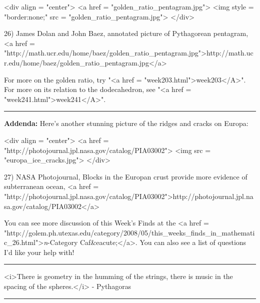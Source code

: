 <div align = "center">
<a href = "golden_ratio_pentagram.jpg">
<img style = "border:none;" src = "golden_ratio_pentagram.jpg">
</div>

26) James Dolan and John Baez, annotated picture of Pythagorean 
pentagram, <a href = "http://math.ucr.edu/home/baez/golden_ratio_pentagram.jpg">http://math.ucr.edu/home/baez/golden_ratio_pentagram.jpg</a>

For more on the golden ratio, try "<a href = "week203.html">week203</A>".  For more on its 
relation to the dodecahedron, see "<a href = "week241.html">week241</A>".

\par\noindent\rule{\textwidth}{0.4pt}
\textbf{Addenda:}
Here's another stunning picture of the ridges and cracks on Europa:

<div align = "center">
<a href = "http://photojournal.jpl.nasa.gov/catalog/PIA03002">
<img src = "europa_ice_cracks.jpg">
</div>

27) NASA Photojournal, Blocks in the Europan crust provide
more evidence of subterranean ocean, <a href = "http://photojournal.jpl.nasa.gov/catalog/PIA03002">http://photojournal.jpl.nasa.gov/catalog/PIA03002</a>

You can see more discussion of this Week's Finds at the <a href =
"http://golem.ph.utexas.edu/category/2008/05/this_weeks_finds_in_mathematic_26.html">\emph{n}-Category
Caf&eacute;</a>.  You can also see a list of questions I'd like your
help with!



\par\noindent\rule{\textwidth}{0.4pt}
<i>There is geometry in the humming of the strings, there is music in
the spacing of the spheres.</i> - Pythagoras

\par\noindent\rule{\textwidth}{0.4pt}

